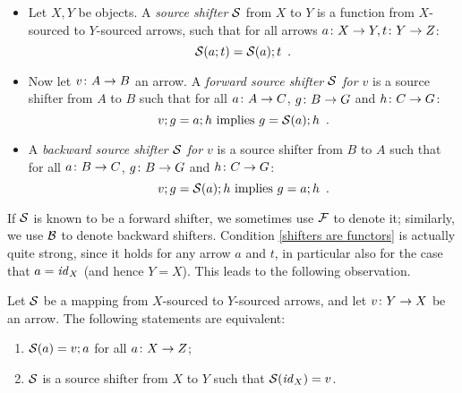 \begin{definition}
\begin{itemize}[topsep=\smallskipamount]
\item Let $X,Y$ be objects. A \emph{source shifter} $\mathcal{S}$ from $X$ to $Y$ is a function from $X$-sourced to $Y$-sourced arrows, such that for all arrows $a\colon X\rightarrow Y, t\colon Y\rightarrow Z$:
%
\begin{equation}\eqlabel{shifters are functors}
\cS(a;t) = \cS(a);t \enspace.
\end{equation}
%
\item Now let $v\colon A\rightarrow B$ an arrow. A \emph{forward source shifter $\mathcal{S}$ for $v$} is a source shifter from $A$ to $B$ such that for all $a\colon A\rightarrow C$, $g\colon B\rightarrow G$ and $h\colon C\rightarrow G$:
%
\begin{equation}\eqlabel{forward condition}
v;g = a;h \text{ implies } g = \cS(a);h \enspace.
\end{equation}
%
\item A \emph{backward source shifter $\mathcal{S}$ for $v$} is a source shifter from $B$ to $A$ such that for all $a\colon B\rightarrow C$, $g\colon B\rightarrow G$ and $h\colon C\rightarrow G$:
%
\begin{equation}\eqlabel{backward condition}
v;g = \cS(a);h \text{ implies } g = a;h \enspace.
\end{equation}
\end{itemize}
\end{definition}
%
If $\mathcal{S}$ is known to be a forward shifter, we sometimes use $\mathcal{F}$ to denote it; similarly, we use $\mathcal{B}$ to denote backward shifters. Condition \eqref{shifters are functors} is actually quite strong, since it holds for any arrow $a$ and $t$, in particular also for the case that $a=\mathit{id}_X$ (and hence $Y=X$). This leads to the following observation.
%
\begin{lemma}
Let $\mathcal{S}$ be a mapping from $X$-sourced to $Y$-sourced arrows, and let $v\colon Y\rightarrow X$ be an arrow. The following statements are equivalent:
\begin{enumerate}[topsep=\smallskipamount,label=(\alph*),ref=(\alph{enumi})]
\item\label{shifter-1} $\mathcal{S}(a)=v;a$ for all $a\colon X\rightarrow Z$;
\item\label{shifter-2} $\mathcal{S}$ is a source shifter from $X$ to $Y$ such that $\mathcal{S}(\mathit{id}_X)=v$.
\end{enumerate}
\end{lemma}
%
